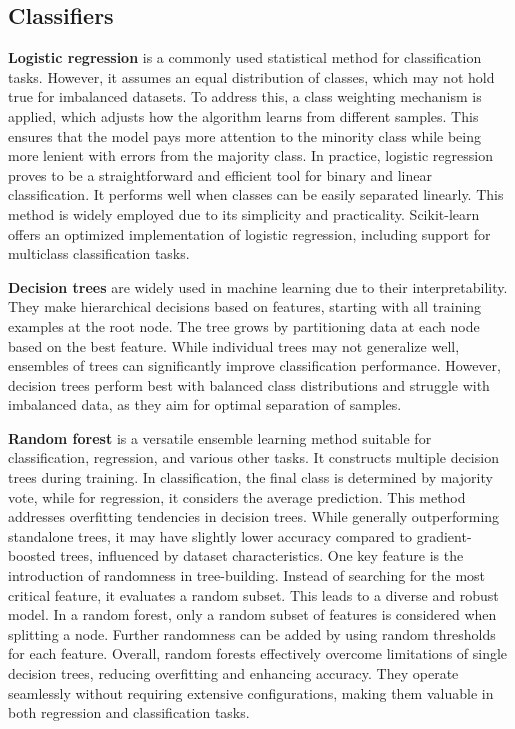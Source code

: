 \subsection{Classifiers}

\textbf{Logistic regression} is a commonly used statistical method for classification tasks. However, it assumes an equal distribution of classes, which may not hold true for imbalanced datasets. To address this, a class weighting mechanism is applied, which adjusts how the algorithm learns from different samples. This ensures that the model pays more attention to the minority class while being more lenient with errors from the majority class.
In practice, logistic regression proves to be a straightforward and efficient tool for binary and linear classification. It performs well when classes can be easily separated linearly. This method is widely employed due to its simplicity and practicality. Scikit-learn offers an optimized implementation of logistic regression, including support for multiclass classification tasks.

\textbf{Decision trees} are widely used in machine learning due to their interpretability. They make hierarchical decisions based on features, starting with all training examples at the root node. The tree grows by partitioning data at each node based on the best feature. While individual trees may not generalize well, ensembles of trees can significantly improve classification performance. However, decision trees perform best with balanced class distributions and struggle with imbalanced data, as they aim for optimal separation of samples.

\textbf{Random forest} is a versatile ensemble learning method suitable for classification, regression, and various other tasks. It constructs multiple decision trees during training. In classification, the final class is determined by majority vote, while for regression, it considers the average prediction. This method addresses overfitting tendencies in decision trees. While generally outperforming standalone trees, it may have slightly lower accuracy compared to gradient-boosted trees, influenced by dataset characteristics.
One key feature is the introduction of randomness in tree-building. Instead of searching for the most critical feature, it evaluates a random subset. This leads to a diverse and robust model. In a random forest, only a random subset of features is considered when splitting a node. Further randomness can be added by using random thresholds for each feature.
Overall, random forests effectively overcome limitations of single decision trees, reducing overfitting and enhancing accuracy. They operate seamlessly without requiring extensive configurations, making them valuable in both regression and classification tasks.